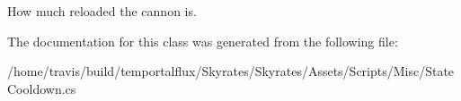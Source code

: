 How much reloaded the cannon is. 



The documentation for this class was generated from the following file\-:\begin{DoxyCompactItemize}
\item 
/home/travis/build/temportalflux/\-Skyrates/\-Skyrates/\-Assets/\-Scripts/\-Misc/State\-Cooldown.\-cs\end{DoxyCompactItemize}
